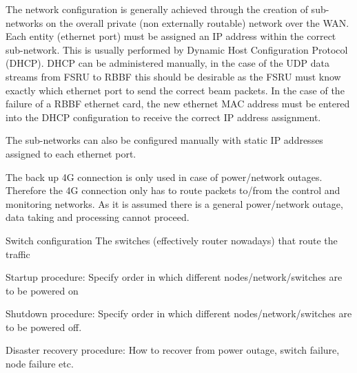\documentclass[12pt,a4paper]{article}
\begin{document}
The network configuration is generally achieved through the creation of sub-networks on the overall private (non externally routable) network over the WAN.
Each entity (ethernet port) must be assigned an IP address within the correct sub-network.
This is usually performed by Dynamic Host Configuration Protocol~\cite{dhcp}  (DHCP).
DHCP can be administered manually, in the case of the UDP data streams from FSRU to RBBF this should be desirable as the FSRU must know exactly which ethernet port to send the correct beam packets.
In the case of the failure of a RBBF ethernet card, the new ethernet MAC address must be entered into the DHCP configuration to receive the correct IP address assignment.

The sub-networks can also be configured manually with static IP addresses assigned to each ethernet port.

The back up 4G connection is only used in case of power/network outages.
Therefore the 4G connection only has to route packets to/from the control and monitoring networks.
As it is assumed there is a general power/network outage, data taking and processing cannot proceed.

\item Switch configuration
The switches (effectively router nowadays) that route the traffic 

\item Startup procedure: Specify order in which different nodes/network/switches are to be powered on
\item Shutdown procedure:  Specify order in which different nodes/network/switches are to be powered off.
\item Disaster recovery procedure: How to recover from power outage, switch failure, node failure etc. 
\eitm
\end{document}

